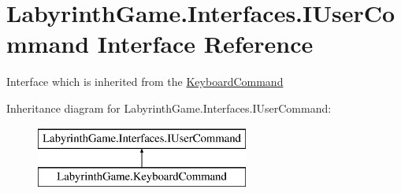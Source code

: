 \hypertarget{interface_labyrinth_game_1_1_interfaces_1_1_i_user_command}{\section{Labyrinth\+Game.\+Interfaces.\+I\+User\+Command Interface Reference}
\label{interface_labyrinth_game_1_1_interfaces_1_1_i_user_command}
}


Interface which is inherited from the \hyperlink{class_labyrinth_game_1_1_keyboard_command}{Keyboard\+Command}  


Inheritance diagram for Labyrinth\+Game.\+Interfaces.\+I\+User\+Command\+:\begin{figure}[H]
\begin{center}
\leavevmode
\includegraphics[height=2.000000cm]{interface_labyrinth_game_1_1_interfaces_1_1_i_user_command}
\end{center}
\end{figure}
